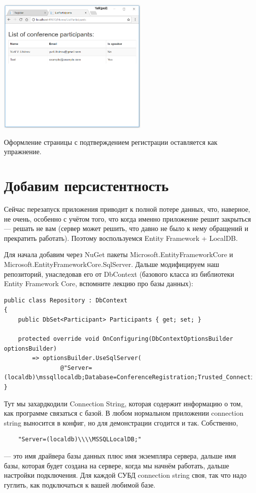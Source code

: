 \documentclass[a5paper]{article}
\begin{document}
\begin{center}
    \includegraphics[width=0.55\textwidth]{styledListParticipants.png}
\end{center}

Оформление страницы с подтверждением регистрации оставляется как упражнение.

\section{Добавим персистентность}

Сейчас перезапуск приложения приводит к полной потере данных, что, наверное, не очень, особенно с учётом того, что когда именно приложение решит закрыться --- решать не вам (сервер может решить, что давно не было к нему обращений и прекратить работать). Поэтому воспользуемся
Entity Framework + LocalDB.

Для начала добавим через NuGet пакеты Microsoft.EntityFrameworkCore и Microsoft.EntityFrameworkCore.SqlServer. Дальше модифицируем наш репозиторий, унаследовав его от DbContext (базового класса из библиотеки Entity Framework Core, вспомните лекцию про базы данных):

\begin{scriptsize}
    \begin{verbatim}
public class Repository : DbContext
{
    public DbSet<Participant> Participants { get; set; }

    protected override void OnConfiguring(DbContextOptionsBuilder optionsBuilder)
        => optionsBuilder.UseSqlServer(
                @"Server=(localdb)\mssqllocaldb;Database=ConferenceRegistration;Trusted_Connection=True;");
}
    \end{verbatim}
\end{scriptsize}

Тут мы захардкодили Connection String, которая содержит информацию о том, как программе связаться с базой. В любом нормальном приложении connection string выносится в конфиг, но для демонстрации сгодится и так. Собственно, 
\begin{verbatim}
    "Server=(localdb)\\\\MSSQLLocalDB;"
\end{verbatim} 
--- это имя драйвера базы данных плюс имя экземпляра сервера, дальше имя базы, которая будет создана на сервере, когда мы начнём работать, дальше настройки подключения. Для каждой СУБД connection string своя, так что надо гуглить, как подключаться к вашей любимой базе.
\end{document}

